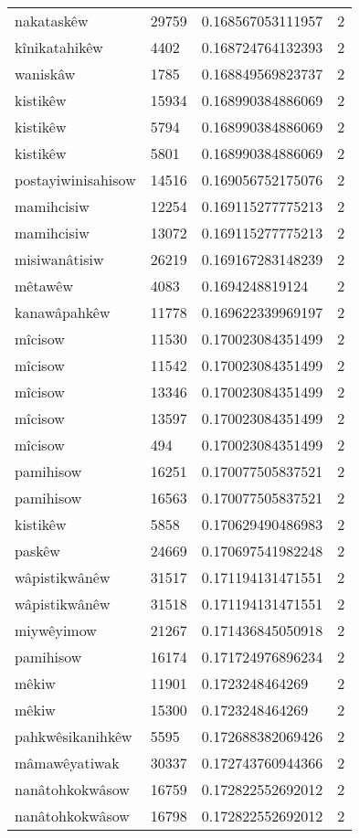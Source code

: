 \begin{longtable}{llll}
nakataskêw & 29759 & 0.168567053111957 & 2 \\
kînikatahikêw & 4402 & 0.168724764132393 & 2 \\
waniskâw & 1785 & 0.168849569823737 & 2 \\
kistikêw & 15934 & 0.168990384886069 & 2 \\
kistikêw & 5794 & 0.168990384886069 & 2 \\
kistikêw & 5801 & 0.168990384886069 & 2 \\
postayiwinisahisow & 14516 & 0.169056752175076 & 2 \\
mamihcisiw & 12254 & 0.169115277775213 & 2 \\
mamihcisiw & 13072 & 0.169115277775213 & 2 \\
misiwanâtisiw & 26219 & 0.169167283148239 & 2 \\
mêtawêw & 4083 & 0.1694248819124 & 2 \\
kanawâpahkêw & 11778 & 0.169622339969197 & 2 \\
mîcisow & 11530 & 0.170023084351499 & 2 \\
mîcisow & 11542 & 0.170023084351499 & 2 \\
mîcisow & 13346 & 0.170023084351499 & 2 \\
mîcisow & 13597 & 0.170023084351499 & 2 \\
mîcisow & 494 & 0.170023084351499 & 2 \\
pamihisow & 16251 & 0.170077505837521 & 2 \\
pamihisow & 16563 & 0.170077505837521 & 2 \\
kistikêw & 5858 & 0.170629490486983 & 2 \\
paskêw & 24669 & 0.170697541982248 & 2 \\
wâpistikwânêw & 31517 & 0.171194131471551 & 2 \\
wâpistikwânêw & 31518 & 0.171194131471551 & 2 \\
miywêyimow & 21267 & 0.171436845050918 & 2 \\
pamihisow & 16174 & 0.171724976896234 & 2 \\
mêkiw & 11901 & 0.1723248464269 & 2 \\
mêkiw & 15300 & 0.1723248464269 & 2 \\
pahkwêsikanihkêw & 5595 & 0.172688382069426 & 2 \\
mâmawêyatiwak & 30337 & 0.172743760944366 & 2 \\
nanâtohkokwâsow & 16759 & 0.172822552692012 & 2 \\
nanâtohkokwâsow & 16798 & 0.172822552692012 & 2 \\

\end{longtable}
